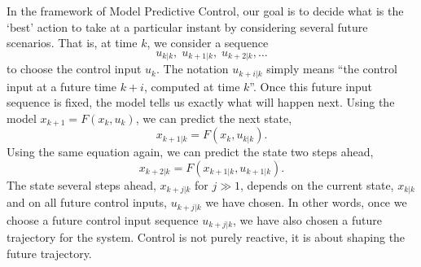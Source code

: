 \documentclass[12pt]{article}
\begin{document}
In the framework of Model Predictive Control, our goal is to decide what is the `best' action to take at a particular instant by considering several future scenarios. That is, at time $k$, we consider a sequence
\[
u_{k|k}, \; u_{k+1|k}, \; u_{k+2|k}, \dots
\]
to choose the control input $u_k$. The notation $u_{k+i|k}$ simply means ``the control input at a future time $k+i$, computed at time $k$''. Once this future input sequence is fixed, the model tells us exactly what will happen next. Using the model $x_{k+1} = F(x_k,u_k)$, we can predict the next state,
\[
x_{k+1|k} = F(x_k, u_{k|k}).
\]
Using the same equation again, we can predict the state two steps ahead,
\[
x_{k+2|k} = F(x_{k+1|k}, u_{k+1|k}).
\]
The state several steps ahead, $x_{k+j|k}$ for $j \gg 1$, depends on the current state, $x_{k|k}$ and on all future control inputs, $u_{k+j|k}$ we have chosen. In other words, once we choose a future control input sequence $u_{k+j|k}$, we have also chosen a future trajectory for the system. Control is not purely reactive, it is about shaping the future trajectory.
\end{document}
